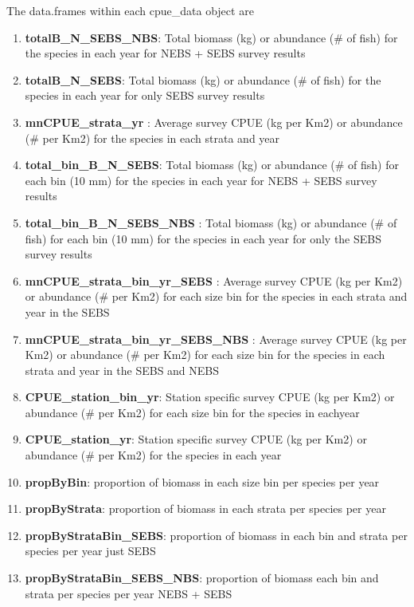 \documentclass[
]{article}
\providecommand{\tightlist}{%
  \setlength{\itemsep}{0pt}\setlength{\parskip}{0pt}}
\begin{document}
The data.frames within each cpue\_data object are

\begin{enumerate}
\def\labelenumi{\arabic{enumi}.}
\tightlist
\item
  \textbf{totalB\_N\_SEBS\_NBS}: Total biomass (kg) or abundance (\# of
  fish) for the species in each year for NEBS + SEBS survey results\\
\item
  \textbf{totalB\_N\_SEBS}: Total biomass (kg) or abundance (\# of fish)
  for the species in each year for only SEBS survey results\\
\item
  \textbf{mnCPUE\_strata\_yr} : Average survey CPUE (kg per Km2) or
  abundance (\# per Km2) for the species in each strata and year\\
\item
  \textbf{total\_bin\_B\_N\_SEBS}: Total biomass (kg) or abundance (\#
  of fish) for each bin (10 mm) for the species in each year for NEBS +
  SEBS survey results\\
\item
  \textbf{total\_bin\_B\_N\_SEBS\_NBS} : Total biomass (kg) or abundance
  (\# of fish) for each bin (10 mm) for the species in each year for
  only the SEBS survey results\\
\item
  \textbf{mnCPUE\_strata\_bin\_yr\_SEBS} : Average survey CPUE (kg per
  Km2) or abundance (\# per Km2) for each size bin for the species in
  each strata and year in the SEBS\\
\item
  \textbf{mnCPUE\_strata\_bin\_yr\_SEBS\_NBS} : Average survey CPUE (kg
  per Km2) or abundance (\# per Km2) for each size bin for the species
  in each strata and year in the SEBS and NEBS\\
\item
  \textbf{CPUE\_station\_bin\_yr}: Station specific survey CPUE (kg per
  Km2) or abundance (\# per Km2) for each size bin for the species in
  eachyear\\
\item
  \textbf{CPUE\_station\_yr}: Station specific survey CPUE (kg per Km2)
  or abundance (\# per Km2) for the species in each year\\
\item
  \textbf{propByBin}: proportion of biomass in each size bin per species
  per year\\
\item
  \textbf{propByStrata}: proportion of biomass in each strata per
  species per year
\item
  \textbf{propByStrataBin\_SEBS}: proportion of biomass in each bin and
  strata per species per year just SEBS
\item
  \textbf{propByStrataBin\_SEBS\_NBS}: proportion of biomass each bin
  and strata per species per year NEBS + SEBS
\end{enumerate}
\end{document}
